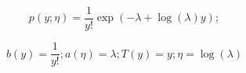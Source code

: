 \begin{answer}

\begin{equation*}
	p(y; \eta) = \frac{1}{y!} \exp(-\lambda + \log(\lambda)y);
\end{equation*}

\begin{equation*}
b(y) = \frac{1}{y!}; a(\eta) = \lambda; T(y) = y; \eta = \log(\lambda)
\end{equation*}

\end{answer}
